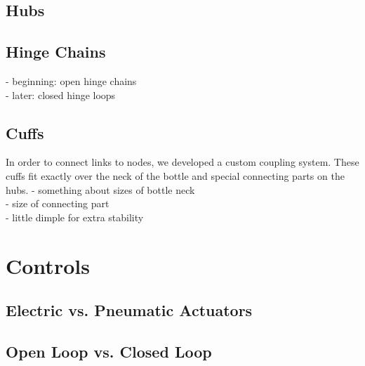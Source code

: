 \subsection{Hubs}
\subsection{Hinge Chains}
- beginning: open hinge chains\\
- later: closed hinge loops
\subsection{Cuffs}
In order to connect links to nodes, we developed a custom coupling system. These cuffs fit exactly over the neck of the bottle and special connecting parts on the hubs.
- something about sizes of bottle neck\\
- size of connecting part\\
- little dimple for extra stability\\
\section{Controls}
\subsection{Electric vs. Pneumatic Actuators}
\subsection{Open Loop vs. Closed Loop}
